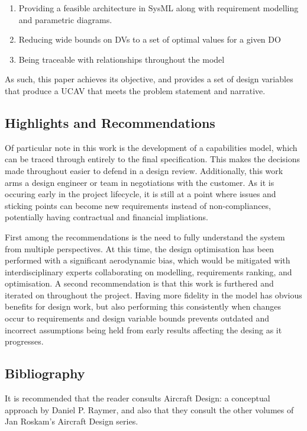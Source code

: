 \documentclass[../main.tex]{subfiles}
\begin{document}
\begin{enumerate}
    \item Providing a feasible architecture in SysML along with requirement modelling and parametric diagrams.
    \item Reducing wide bounds on DVs to a set of optimal values for a given DO
    \item Being traceable with relationships throughout the model
\end{enumerate}

As such, this paper achieves its objective, and provides a set of design variables that produce a UCAV that meets the problem statement and narrative.

\subsection{Highlights and Recommendations}

Of particular note in this work is the development of a capabilities model, which can be traced through entirely to the final specification.
This makes the decisions made throughout easier to defend in a design review.
Additionally, this work arms a design engineer or team in negotiations with the customer.
As it is occuring early in the project lifecycle, it is still at a point where issues and sticking points can become new requirements instead of non-compliances, potentially having contractual and financial impliations.

First among the recommendations is the need to fully understand the system from multiple perspectives.
At this time, the design optimisation has been performed with a significant aerodynamic bias, which would be mitigated with interdisciplinary experts collaborating on modelling, requirements ranking, and optimisation.
A second recommendation is that this work is furthered and iterated on throughout the project.
Having more fidelity in the model has obvious benefits for design work, but also performing this consistently when changes occur to requirements and design variable bounds prevents outdated and incorrect assumptions being held from early results affecting the desing as it progresses.

\subsection{Bibliography}
It is recommended that the reader consults Aircraft Design: a conceptual approach by Daniel P. Raymer, and also that they consult the other volumes of Jan Roskam's Aircraft Design series.
\end{document}
